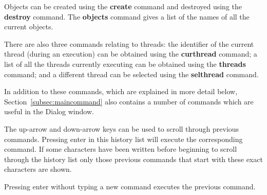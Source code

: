 \documentclass[\pformat,12pt]{article}
\newcommand{\guicmd}[1]{{\sf #1}}
\begin{document}
Objects can be created using the \textbf{create} command
 and destroyed
using the \textbf{destroy} command. The
\textbf{objects} command gives 
a list of the names of all the current objects.

There are also three commands relating to threads: the identifier of
the current thread (during an execution) can be obtained using the
\textbf{curthread} command; a list of all
the threads currently executing can be obtained using the
\textbf{threads} command; and a 
different thread can be selected using the \textbf{selthread}
command.



In addition to these commands, which are explained in more detail below,
Section~\ref{subsec:maincommand} also contains a number of commands
which are useful in the \guicmd{Dialog} window.

The up-arrow and down-arrow keys can be used to scroll through
previous commands. Pressing enter in this history list will execute
the corresponding command.  If some characters have been written
before beginning to scroll through the history list only those
previous commands that start with these exact characters are shown.

Pressing enter without typing a new command executes the previous
command.
\end{document}
